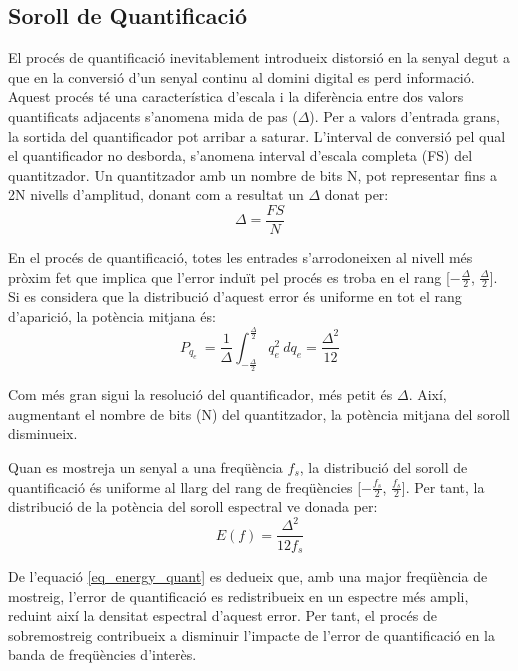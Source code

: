 \subsection{Soroll de Quantificació}
\par El procés de quantificació inevitablement introdueix distorsió en la senyal degut a que en la conversió d'un senyal continu al domini digital es perd informació. Aquest procés té una característica d'escala i la diferència entre dos valors quantificats adjacents s'anomena mida de pas ($\Delta$). Per a valors d'entrada grans, la sortida del quantificador pot arribar a saturar. L'interval de conversió pel qual el quantificador no desborda, s'anomena interval d'escala completa (FS) del quantitzador. Un quantitzador amb un nombre de bits N, pot representar fins a 2N nivells d'amplitud, donant com a resultat un $\Delta$ donat per:
\begin{equation}\label{eq_stepsize}
    \Delta = \frac{FS}{N}
\end{equation}
\par En el procés de quantificació, totes les entrades s'arrodoneixen al nivell més pròxim fet que implica que l'error induït pel procés es troba en el rang [$-\frac{\Delta}{2}$, $\frac{\Delta}{2}$]. Si es considera que la distribució d'aquest error és uniforme en tot el rang d'aparició, la potència mitjana és:
\begin{equation}\label{eq_pwrquant}
    P_{q_{e}}\ = \frac{1}{\Delta} \int_{-\frac{\Delta}{2}}^{\frac{\Delta}{2}} q_{e}^2 \ d q_{e} = \frac{\Delta^2}{12}
\end{equation}
\par Com més gran sigui la resolució del quantificador, més petit és $\Delta$. Així, augmentant el nombre de bits (N) del quantitzador, la potència mitjana del soroll disminueix. 
\par Quan es mostreja un senyal a una freqüència $f_s$, la distribució del soroll de quantificació és uniforme al llarg del rang de freqüències [$-\frac{f_s}{2}$, $\frac{f_s}{2}$]. Per tant, la distribució de la potència del soroll espectral ve donada per: 
\begin{equation}\label{eq_energy_quant}
    E(f) = \frac{\Delta^2}{12 f_s}
\end{equation}
\par De l'equació \ref{eq_energy_quant} es dedueix que, amb una major freqüència de mostreig, l'error de quantificació es redistribueix en un espectre més ampli, reduint així la densitat espectral d'aquest error. Per tant, el procés de sobremostreig contribueix a disminuir l'impacte de l'error de quantificació en la banda de freqüències d'interès.
